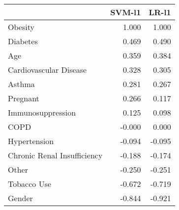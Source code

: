 \begin{tabular}{lrr}
\toprule
{} &  SVM-l1 &  LR-l1 \\
\midrule
Obesity                     &   1.000 &  1.000 \\
Diabetes                    &   0.469 &  0.490 \\
Age                         &   0.359 &  0.384 \\
Cardiovascular Disease      &   0.328 &  0.305 \\
Asthma                      &   0.281 &  0.267 \\
Pregnant                    &   0.266 &  0.117 \\
Immunosuppression           &   0.125 &  0.098 \\
COPD                        &  -0.000 &  0.000 \\
Hypertension                &  -0.094 & -0.095 \\
Chronic Renal Insufficiency &  -0.188 & -0.174 \\
Other                       &  -0.250 & -0.251 \\
Tobacco Use                 &  -0.672 & -0.719 \\
Gender                      &  -0.844 & -0.921 \\
\bottomrule
\end{tabular}
